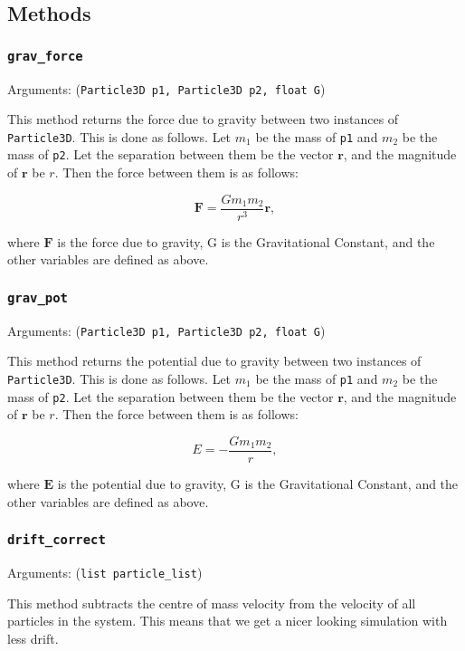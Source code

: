 \documentclass[a4paper, 11pt, british, left=1in, right=1in, top=0.3in, bottom=1in]{article}
\begin{document}
	\subsection{Methods}
	
	\subsubsection{\texttt{grav\_force}}
	
	Arguments: (\texttt{Particle3D p1, Particle3D p2, float G})
	
	This method returns the force due to gravity between two instances of \texttt{Particle3D}. This is done as follows. Let $m_1$ be the mass of \texttt{p1} and $m_2$ be the mass of \texttt{p2}. Let the separation between them be the vector $\textbf{r}$, and the magnitude of $\textbf{r}$ be $r$. Then the force between them is as follows:
	
	$$\textbf{F} = \frac{Gm_1m_2}{r^3}\textbf{r},$$
	
	where $\textbf{F}$ is the force due to gravity, G is the Gravitational Constant, and the other variables are defined as above. 
	
	\subsubsection{\texttt{grav\_pot}}
	
	Arguments: (\texttt{Particle3D p1, Particle3D p2, float G})
	
	This method returns the potential due to gravity between two instances of \texttt{Particle3D}. This is done as follows. Let $m_1$ be the mass of \texttt{p1} and $m_2$ be the mass of \texttt{p2}. Let the separation between them be the vector $\textbf{r}$, and the magnitude of $\textbf{r}$ be $r$. Then the force between them is as follows:
	
	$$E = -\frac{Gm_1m_2}{r},$$
	
	where $\textbf{E}$ is the potential due to gravity, G is the Gravitational Constant, and the other variables are defined as above. 
	
	\subsubsection{\texttt{drift\_correct}}
	
	Arguments: (\texttt{list particle\_list})
	
	This method subtracts the centre of mass velocity from the velocity of all particles in the system. This means that we get a nicer looking simulation with less drift. 
	
\end{document}
